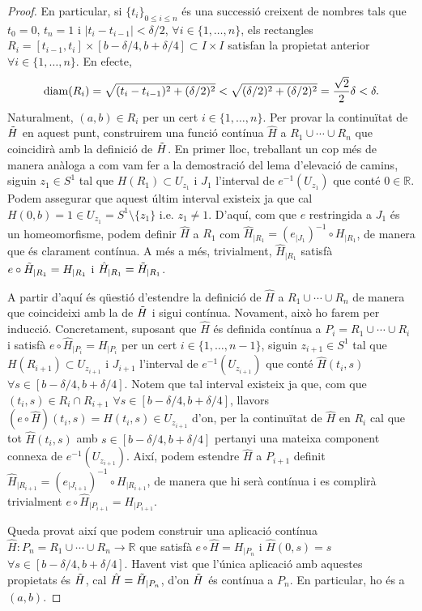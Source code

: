 \documentclass[../main.tex]{subfiles}
\begin{document}
\begin{proof}
En particular, si $\{t_i\}_{0\leq i\leq n}$ és una successió creixent de nombres tals que $t_0=0$, $t_n=1$ i $|t_i-t_{i-1}|<\delta/2$, $\forall i\in\{1,\ldots,n\}$, els rectangles $R_i = [t_{i-1},t_i]\times [b-\delta/4,b+\delta/4]\subset I\times I$ satisfan la propietat anterior $\forall i\in\{1,\ldots,n\}$. En efecte,
\begin{equation}
    \notag
    \mathrm{diam}(R_i) = \sqrt{(t_i-t_{i-1})^2+(\delta/2)^2}<\sqrt{(\delta/2)^2+(\delta/2)^2} = \frac{\sqrt{2}}{2}\delta<\delta.
\end{equation}
Naturalment, $(a,b)\in R_i$ per un cert $i\in \{1,\ldots,n\}$. Per provar la continuïtat de $\Tilde{H}$ en aquest punt, construirem una funció contínua $\hat{H}$ a $R_1\cup\cdots\cup R_n$ que coincidirà amb la definició de $\Tilde{H}$. En primer lloc, treballant un cop més de manera anàloga a com vam fer a la demostració del lema d'elevació de camins, siguin $z_1\in S^1$ tal que $H(R_1) \subset U_{z_1}$ i $J_1$ l'interval de $e^{-1}(U_{z_1})$ que conté $0\in \mathbb{R}$. Podem assegurar que aquest últim interval existeix ja que cal $H(0,b) = 1\in U_{z_1}=S^1\setminus\{z_1\}$ i.e. $z_1\not=1$. D'aquí, com que $e$ restringida a $J_1$ és un homeomorfisme, podem definir $\hat{H}$ a $R_1$ com $\hat{H}_{|R_1} = (e_{|J_1})^{-1}\circ H_{|R_1}$, de manera que és clarament contínua. A més a més, trivialment, $\hat{H}_{|R_1}$ satisfà $e\circ \Tilde{H}_{|R_1} = H_{|R_1}$ i $\hat{H}_{|R_1}=\Tilde{H}_{|R_1}$.

A partir d'aquí és qüestió d'estendre la definició de $\hat{H}$ a $R_1\cup \cdots \cup R_n$ de manera que coincideixi amb la de $\Tilde{H}$ i sigui contínua. Novament, això ho farem per inducció. Concretament, suposant que $\hat{H}$ és definida contínua a $P_i = R_1\cup\cdots\cup R_i$ i satisfà $e\circ \hat{H}_{|P_i}=H_{|P_i}$ per un cert $i\in\{1,\ldots,n-1\}$, siguin $z_{i+1}\in S^1$ tal que $H(R_{i+1})\subset U_{z_{i+1}}$ i $J_{i+1}$ l'interval de $e^{-1}(U_{z_{i+1}})$ que conté $\hat{H}(t_i,s)$ $\forall s\in [b-\delta/4,b+\delta/4]$. Notem que tal interval existeix ja que, com que $(t_i,s)\in R_i\cap R_{i+1}$ $\forall s\in [b-\delta/4,b+\delta/4]$, llavors $(e\circ \hat{H})(t_i,s) = H(t_i,s)\in U_{z_{i+1}}$ d'on, per la continuïtat de $\hat{H}$ en $R_i$ cal que tot $\hat{H}(t_i,s)$ amb $s\in [b-\delta/4,b+\delta/4]$ pertanyi una mateixa component connexa de $e^{-1}(U_{z_{i+1}})$. Així, podem estendre $\hat{H}$ a $P_{i+1}$ definit $\hat{H}_{|R_{i+1}} = (e_{|J_{i+1}})^{-1}\circ H_{|R_{i+1}}$, de manera que hi serà contínua i es complirà trivialment $e\circ \hat{H}_{|P_{i+1}} = H_{|P_{i+1}}$.

Queda provat així que podem construir una aplicació contínua $\hat{H}:P_n = R_1\cup\cdots\cup R_n\rightarrow\mathbb{R}$ que satisfà $e\circ \hat{H} = H_{|P_n}$ i $\hat{H}(0,s) = s$ $\forall s\in[b-\delta/4,b+\delta/4]$. Havent vist que l'única aplicació amb aquestes propietats és $\Tilde{H}$, cal $\hat{H} = \Tilde{H}_{|P_n}$, d'on $\Tilde{H}$ és contínua a $P_n$. En particular, ho és a $(a,b)$.
\end{proof}
\end{document}
